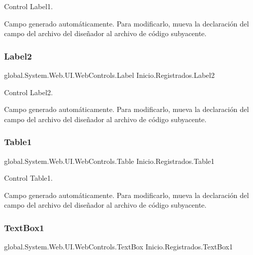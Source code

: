 Control Label1. 

Campo generado automáticamente. Para modificarlo, mueva la declaración del campo del archivo del diseñador al archivo de código subyacente. \mbox{\label{class_inicio_1_1_registrados_ab7c3cf09be993fe6a07f31881ba27159}} 
\subsubsection{\texorpdfstring{Label2}{Label2}}
{\footnotesize\ttfamily global.\+System.\+Web.\+U\+I.\+Web\+Controls.\+Label Inicio.\+Registrados.\+Label2\hspace{0.3cm}{\ttfamily [protected]}}



Control Label2. 

Campo generado automáticamente. Para modificarlo, mueva la declaración del campo del archivo del diseñador al archivo de código subyacente. \mbox{\label{class_inicio_1_1_registrados_a0c8cbd7625175b47e930f927da038acc}} 
\subsubsection{\texorpdfstring{Table1}{Table1}}
{\footnotesize\ttfamily global.\+System.\+Web.\+U\+I.\+Web\+Controls.\+Table Inicio.\+Registrados.\+Table1\hspace{0.3cm}{\ttfamily [protected]}}



Control Table1. 

Campo generado automáticamente. Para modificarlo, mueva la declaración del campo del archivo del diseñador al archivo de código subyacente. \mbox{\label{class_inicio_1_1_registrados_a2ec529c41bccbe1d45b53e29aad8d1f4}} 
\subsubsection{\texorpdfstring{TextBox1}{TextBox1}}
{\footnotesize\ttfamily global.\+System.\+Web.\+U\+I.\+Web\+Controls.\+Text\+Box Inicio.\+Registrados.\+Text\+Box1\hspace{0.3cm}{\ttfamily [protected]}}



